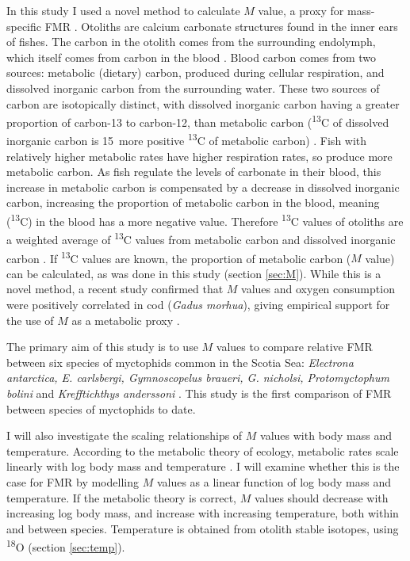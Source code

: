 \documentclass[12pt, titlepage]{article}
\begin{document}
In this study I used a novel method to calculate $M$ value, a proxy for mass-specific FMR \citep{Chung2019b}.
Otoliths are calcium carbonate structures found in the inner ears of fishes.
The carbon in the otolith comes from the surrounding endolymph, which itself comes from carbon in the blood \citep{Campana1998, Solomon2006}.
Blood carbon comes from two sources: metabolic (dietary) carbon, produced during cellular respiration, and dissolved inorganic carbon from the surrounding water.
These two sources of carbon are isotopically distinct, with dissolved inorganic carbon having a greater proportion of carbon-13 to carbon-12, than metabolic carbon (\textdelta \textsuperscript{13}C of dissolved inorganic carbon is 15\permil\ more positive \textdelta \textsuperscript{13}C of metabolic carbon) \citep{Magozzi2017, Tagliabue2008}.
Fish with relatively higher metabolic rates have higher respiration rates, so produce more metabolic carbon.
As fish regulate the levels of carbonate in their blood, this increase in metabolic carbon is compensated by a decrease in dissolved inorganic carbon, increasing the proportion of metabolic carbon in the blood, meaning (\textdelta \textsuperscript{13}C) in the blood has a more negative value.
Therefore \textdelta \textsuperscript{13}C values of otoliths are a weighted average of \textdelta \textsuperscript{13}C values from metabolic carbon and dissolved inorganic carbon \citep{Chung2019b, Trueman2016}.
If \textdelta \textsuperscript{13}C values are known, the proportion of metabolic carbon ($M$ value) can be calculated, as was done in this study (section \ref{sec:M}).
While this is a novel method, a recent study confirmed that $M$ values and oxygen consumption were positively correlated in cod (\textit{Gadus morhua}), giving empirical support for the use of $M$ as a metabolic proxy \citep{Chung2019a}.

The primary aim of this study is to use $M$ values to compare relative FMR between six species of myctophids common in the Scotia Sea: \textit{Electrona antarctica, E. carlsbergi, Gymnoscopelus braueri, G. nicholsi, Protomyctophum bolini} and \textit{Krefftichthys anderssoni} \citep{Collins2008, Collins2012, Piatkowski1994}.
This study is the first comparison of FMR between species of myctophids to date.

I will also investigate the scaling relationships of $M$ values with body mass and temperature.
According to the metabolic theory of ecology, metabolic rates scale linearly with log body mass and temperature \citep{Brown2004}.
I will examine whether this is the case for FMR by modelling $M$ values as a linear function of log body mass and temperature.
If the metabolic theory is correct, $M$ values should decrease with increasing log body mass, and increase with increasing temperature, both within and between species.
Temperature is obtained from otolith stable isotopes, using \textdelta \textsuperscript{18}O (section \ref{sec:temp}).
\end{document}
